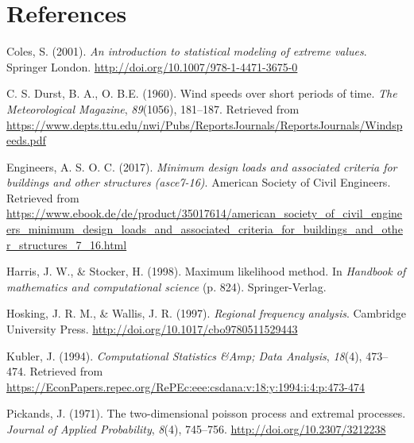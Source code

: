 \documentclass[12pt,oneside]{reedthesis}
\begin{document}
\backmatter

\hypertarget{references}{%
\chapter*{References}\label{references}}


\noindent

\setlength{\parindent}{-0.20in}
\setlength{\leftskip}{0.20in}
\setlength{\parskip}{8pt}

\hypertarget{refs}{}
\leavevmode\hypertarget{ref-Coles2001}{}%
Coles, S. (2001). \emph{An introduction to statistical modeling of extreme values}. Springer London. \url{http://doi.org/10.1007/978-1-4471-3675-0}

\leavevmode\hypertarget{ref-Durst1960}{}%
C. S. Durst, B. A., O. B.E. (1960). Wind speeds over short periods of time. \emph{The Meteorological Magazine}, \emph{89}(1056), 181--187. Retrieved from \url{https://www.depts.ttu.edu/nwi/Pubs/ReportsJournals/ReportsJournals/Windspeeds.pdf}

\leavevmode\hypertarget{ref-Asce2017}{}%
Engineers, A. S. O. C. (2017). \emph{Minimum design loads and associated criteria for buildings and other structures (asce7-16)}. American Society of Civil Engineers. Retrieved from \url{https://www.ebook.de/de/product/35017614/american_society_of_civil_engineers_minimum_design_loads_and_associated_criteria_for_buildings_and_other_structures_7_16.html}

\leavevmode\hypertarget{ref-Harris1994}{}%
Harris, J. W., \& Stocker, H. (1998). Maximum likelihood method. In \emph{Handbook of mathematics and computational science} (p. 824). Springer-Verlag.

\leavevmode\hypertarget{ref-Hosking1997}{}%
Hosking, J. R. M., \& Wallis, J. R. (1997). \emph{Regional frequency analysis}. Cambridge University Press. \url{http://doi.org/10.1017/cbo9780511529443}

\leavevmode\hypertarget{ref-Kubler1994}{}%
Kubler, J. (1994). \emph{Computational Statistics \&Amp; Data Analysis}, \emph{18}(4), 473--474. Retrieved from \url{https://EconPapers.repec.org/RePEc:eee:csdana:v:18:y:1994:i:4:p:473-474}

\leavevmode\hypertarget{ref-Pickands1971}{}%
Pickands, J. (1971). The two-dimensional poisson process and extremal processes. \emph{Journal of Applied Probability}, \emph{8}(4), 745--756. \url{http://doi.org/10.2307/3212238}
\end{document}
